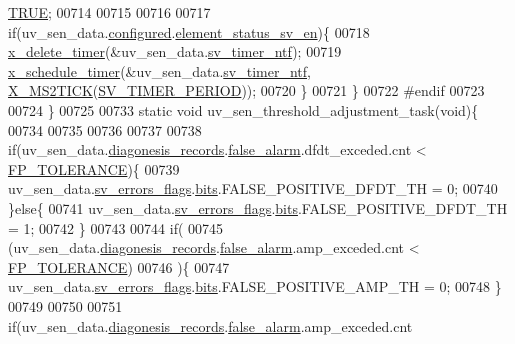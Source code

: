 \begin{DoxyCode}
      \hyperlink{a00040_aa8cecfc5c5c054d2875c03e77b7be15d}{TRUE};
00714 
00715 
00716 
00717     \textcolor{keywordflow}{if}(uv\_sen\_data.\hyperlink{a00035_a94b2d1f6ea4ab334c74d24984dd27843}{configured}.\hyperlink{a00021_afeb3f74725269028a60926f98890c22b}{element\_status\_sv\_en})\{
00718     \hyperlink{a00036_ab69e9af4cfa717e870d587906283635c}{x\_delete\_timer}(&uv\_sen\_data.\hyperlink{a00035_ada91b200053f2d93e3639dc4ee3415b4}{sv\_timer\_ntf});
00719     \hyperlink{a00036_a9e3befaa21e83f196f74201deed85346}{x\_schedule\_timer}(&uv\_sen\_data.\hyperlink{a00035_ada91b200053f2d93e3639dc4ee3415b4}{sv\_timer\_ntf},
      \hyperlink{a00036_a1732cd929c486b3a225824bb2b3dba36}{X\_MS2TICK}(\hyperlink{a00023_a8a535456285f4602701c814d7b69cc68}{SV\_TIMER\_PERIOD}));
00720     \}
00721     \}
00722 \textcolor{preprocessor}{#endif}
00723 
00724 \}
00725 
00733  \textcolor{keyword}{static} \textcolor{keywordtype}{void} uv\_sen\_threshold\_adjustment\_task(\textcolor{keywordtype}{void})\{
00734 
00735 
00736 
00737 
00738                 \textcolor{keywordflow}{if}(uv\_sen\_data.\hyperlink{a00035_a7ae905b560513ad201e58c2f63375030}{diagonesis\_records}.\hyperlink{a00017_a799f50625c0c03f9404a59287810113d}{false\_alarm}.dfdt\_exceded.cnt
       < \hyperlink{a00017_a946f0acff4fd16a65859479e9e0b9513}{FP\_TOLERANCE})\{
00739                      uv\_sen\_data.\hyperlink{a00035_aaeec6b0609dba31393f337abf1cce3d3}{sv\_errors\_flags}.\hyperlink{a00022_ab81eb6fb4f1351ed07b4d6c4dd6f1959}{bits}.FALSE\_POSITIVE\_DFDT\_TH        = 0;
00740                 \}\textcolor{keywordflow}{else}\{
00741                      uv\_sen\_data.\hyperlink{a00035_aaeec6b0609dba31393f337abf1cce3d3}{sv\_errors\_flags}.\hyperlink{a00022_ab81eb6fb4f1351ed07b4d6c4dd6f1959}{bits}.FALSE\_POSITIVE\_DFDT\_TH        = 1;
00742                 \}
00743 
00744                 \textcolor{keywordflow}{if}(
00745                   (uv\_sen\_data.\hyperlink{a00035_a7ae905b560513ad201e58c2f63375030}{diagonesis\_records}.\hyperlink{a00017_a799f50625c0c03f9404a59287810113d}{false\_alarm}.amp\_exceded.cnt 
      < \hyperlink{a00017_a946f0acff4fd16a65859479e9e0b9513}{FP\_TOLERANCE})
00746                  )\{
00747                   uv\_sen\_data.\hyperlink{a00035_aaeec6b0609dba31393f337abf1cce3d3}{sv\_errors\_flags}.\hyperlink{a00022_ab81eb6fb4f1351ed07b4d6c4dd6f1959}{bits}.FALSE\_POSITIVE\_AMP\_TH  = 0;
00748                 \}
00749 
00750 
00751                 \textcolor{keywordflow}{if}(uv\_sen\_data.\hyperlink{a00035_a7ae905b560513ad201e58c2f63375030}{diagonesis\_records}.\hyperlink{a00017_a799f50625c0c03f9404a59287810113d}{false\_alarm}.amp\_exceded.cnt 

\end{DoxyCode}
